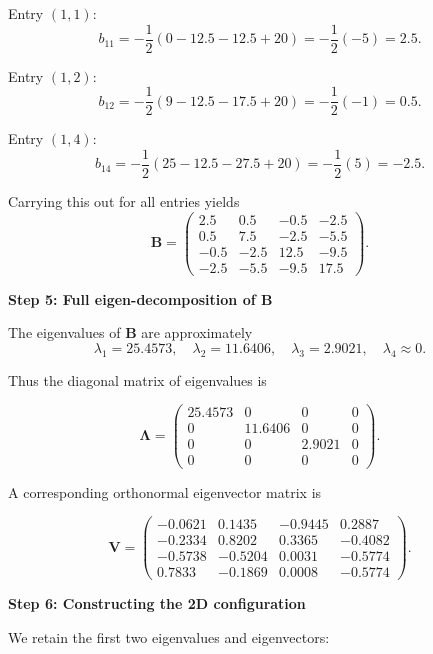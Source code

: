 \medskip

Entry $(1,1)$:
\[
b_{11}
=
-\frac{1}{2}
\left(
0 - 12.5 - 12.5 + 20
\right)
=
-\frac{1}{2}(-5)
=
2.5.
\]

\medskip

Entry $(1,2)$:
\[
b_{12}
=
-\frac{1}{2}
\left(
9 - 12.5 - 17.5 + 20
\right)
=
-\frac{1}{2}(-1)
=
0.5.
\]

\medskip

Entry $(1,4)$:
\[
b_{14}
=
-\frac{1}{2}
\left(
25 - 12.5 - 27.5 + 20
\right)
=
-\frac{1}{2}(5)
=
-2.5.
\]

Carrying this out for all entries yields
\[
\mathbf{B}
=
\begin{pmatrix}
2.5 & 0.5 & -0.5 & -2.5 \\
0.5 & 7.5 & -2.5 & -5.5 \\
-0.5 & -2.5 & 12.5 & -9.5 \\
-2.5 & -5.5 & -9.5 & 17.5
\end{pmatrix}.
\]

\medskip
\noindent
\textbf{Step 5: Full eigen-decomposition of $\mathbf{B}$}

\medskip

The eigenvalues of $\mathbf{B}$ are approximately
\[
\lambda_1 = 25.4573, \quad
\lambda_2 = 11.6406, \quad
\lambda_3 = 2.9021, \quad
\lambda_4 \approx 0.
\]

Thus the diagonal matrix of eigenvalues is

\[
\mathbf{\Lambda}
=
\begin{pmatrix}
25.4573 & 0 & 0 & 0 \\
0 & 11.6406 & 0 & 0 \\
0 & 0 & 2.9021 & 0 \\
0 & 0 & 0 & 0
\end{pmatrix}.
\]

A corresponding orthonormal eigenvector matrix is

\[
\mathbf{V}
=
\begin{pmatrix}
-0.0621 & 0.1435 & -0.9445 & 0.2887 \\
-0.2334 & 0.8202 & 0.3365 & -0.4082 \\
-0.5738 & -0.5204 & 0.0031 & -0.5774 \\
0.7833 & -0.1869 & 0.0008 & -0.5774
\end{pmatrix}.
\]

\medskip
\noindent
\textbf{Step 6: Constructing the 2D configuration}

\medskip

We retain the first two eigenvalues and eigenvectors:

